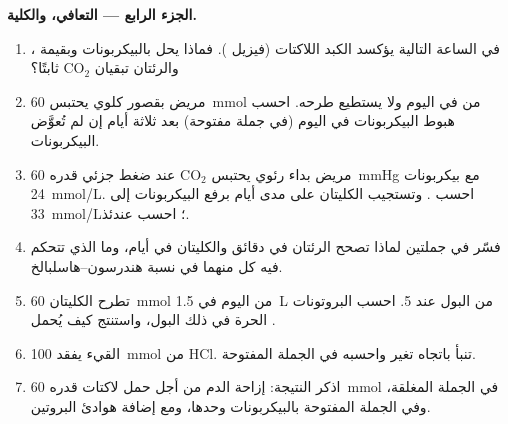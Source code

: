 \begin{problem}
\medskip
\noindent\textbf{الجزء الرابع --- التعافي، والكلية.}
\begin{enumerate}[resume]
  \item في الساعة التالية يؤكسد الكبد اللاكتات (فيزيل ). فماذا
        يحل بالبيكربونات وبقيمة ، والرئتان تبقيان $\mathrm{CO_2}$
        ثابتًا؟
  \item مريض بقصور كلوي يحتبس \qty{60}{mmol} من  في اليوم ولا
        يستطيع طرحه. احسب هبوط البيكربونات في اليوم (في جملة مفتوحة)
         بعد ثلاثة أيام إن لم تُعوَّض البيكربونات.
  \item مريض بداء رئوي يحتبس $\mathrm{CO_2}$ عند ضغط جزئي قدره
        \qty{60}{mmHg} مع بيكربونات \qty{24}{mmol/L}. احسب .
        وتستجيب الكليتان على مدى أيام برفع البيكربونات إلى
        \qty{33}{mmol/L}؛ احسب  عندئذ.
  \item فسّر في جملتين لماذا تصحح الرئتان  في دقائق والكليتان في
        أيام، وما الذي تتحكم فيه كل منهما في نسبة هندرسون--هاسلبالخ.
  \item تطرح الكليتان \qty{60}{mmol} من  اليوم في \qty{1.5}{L} من
        البول عند  5. احسب البروتونات الحرة في ذلك البول، واستنتج
        كيف يُحمل .
  \item القيء يفقد \qty{100}{mmol} من HCl. تنبأ باتجاه تغير 
        واحسبه في الجملة المفتوحة.
  \item اذكر النتيجة: إزاحة  الدم من أجل حمل لاكتات قدره
        \qty{60}{mmol} في الجملة المغلقة، وفي الجملة المفتوحة
        بالبيكربونات وحدها، ومع إضافة هوادئ البروتين.
\end{enumerate}
\end{problem}
